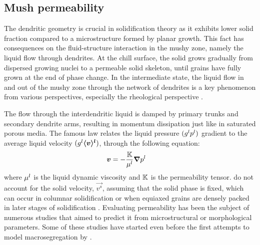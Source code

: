 \subsection{Mush permeability}

The dendritic geometry is crucial in solidification theory as it exhibits lower solid 
fraction compared to a microstructure formed by planar growth.
This fact has consequences on the fluid-structure interaction in the mushy zone, namely 
the liquid flow through dendrites. At the chill surface,
the solid  grows gradually from dispersed growing nuclei to a permeable solid skeleton, 
until grains have fully grown at the end of phase change.
In the intermediate state, the liquid flow in and out of the mushy zone through the network 
of dendrites is a key phenomenon from various perspectives, 
especially the rheological perspective .


The flow through the interdendritic liquid is damped by primary trunks and secondary 
dendrite arms, resulting in momentum dissipation just like in saturated porous media. 
The famous \citet{darcy_les_1856} law relates the liquid pressure $({g^l} {p^l})$ gradient to 
the average liquid velocity $({g^l} \boldsymbol{\langle v \rangle^l})$, 
through the following equation:
\begin{align}
\label{eq:darcy}
& \boldsymbol{v} =-\frac{\mathbb{K}}{\mu^l} \boldsymbol{\nabla} {p^l}
\end{align}
where $\mu^l$ is the liquid dynamic viscosity and $\mathbb{K}$ is the permeability tensor.
 do not account for the solid velocity, $\vec{v^s}$, assuming that the solid phase is fixed,
which can occur in columnar solidification or when equiaxed grains are densely packed in later stages of solidification \citep{rappaz_numerical_2003}.
Evaluating permeability has been the subject of numerous studies that aimed
to predict it from microstructural or morphological parameters.
Some of these studies have started even before the first attempts to model macrosegregation by 
\citet{flemings_macrosegregation:_1967, flemings_macrosegregation:_1968-1,flemings_macrosegregation:_1968}. 

